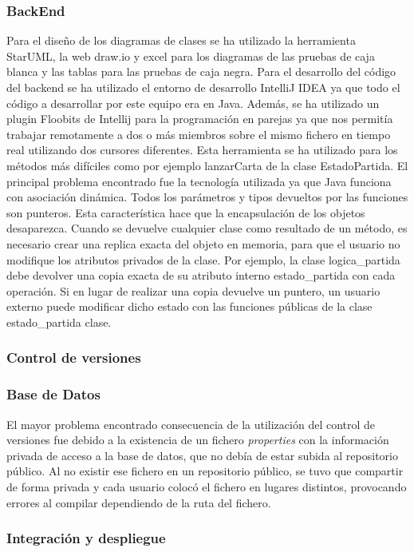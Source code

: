 \subsubsection*{BackEnd}
Para el diseño de los diagramas de clases se ha utilizado la herramienta StarUML, la web draw.io y excel para los diagramas de las pruebas de caja blanca y las tablas para las pruebas de caja negra.
Para el desarrollo del código del backend se ha utilizado el entorno de desarrollo IntelliJ IDEA ya que todo el código a desarrollar por este equipo era en Java.
Además, se ha utilizado un plugin Floobits de Intellij para la programación en parejas ya que nos permitía trabajar remotamente a dos o más miembros sobre el mismo fichero en tiempo real utilizando dos cursores diferentes. Esta herramienta se ha utilizado para los métodos más difíciles como por ejemplo lanzarCarta de la clase EstadoPartida.
El principal problema encontrado fue la tecnología utilizada ya que Java funciona con asociación dinámica. Todos los parámetros y tipos devueltos por las funciones son punteros. Esta característica hace que la encapsulación de los objetos desaparezca. Cuando se devuelve cualquier clase como resultado de un método, es necesario crear una replica exacta del objeto en memoria, para que el usuario no modifique los atributos privados de la clase. Por ejemplo, la clase logica\_partida debe devolver una copia exacta de su atributo interno estado\_partida con cada operación. Si en lugar de realizar una copia devuelve un puntero, un usuario externo puede modificar dicho estado con las funciones públicas de la clase estado\_partida clase.
\subsubsection{Control de versiones}
\subsubsection*{Base de Datos}
El mayor problema encontrado consecuencia de la utilización del control de versiones fue debido a la existencia de un fichero \textit{properties} con la información privada de acceso a la base de datos, que no debía de estar subida al repositorio público. Al no existir ese fichero en un repositorio público, se tuvo que compartir de forma privada y cada usuario colocó el fichero en lugares distintos, provocando errores al compilar dependiendo de la ruta del fichero.
\subsubsection*{Integración y despliegue}
